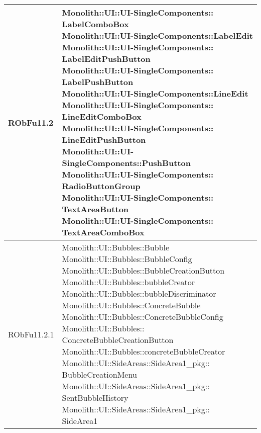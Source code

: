 \begin{center}
\begin{longtable}{|
*{1}{>{\centering\arraybackslash}m{2.5cm}|}
*{1}{>{\centering\arraybackslash}m{7.5cm}|}}
RObFu11.2 & \makecell[l]{Monolith::UI::UI-SingleComponents:: \\ \hfill LabelComboBox
\\Monolith::UI::UI-SingleComponents::LabelEdit
\\Monolith::UI::UI-SingleComponents:: \\ \hfill LabelEditPushButton
\\Monolith::UI::UI-SingleComponents:: \\ \hfill LabelPushButton
\\Monolith::UI::UI-SingleComponents::LineEdit
\\Monolith::UI::UI-SingleComponents:: \\ \hfill LineEditComboBox
\\Monolith::UI::UI-SingleComponents:: \\ \hfill LineEditPushButton
\\Monolith::UI::UI-SingleComponents::PushButton
\\Monolith::UI::UI-SingleComponents:: \\ \hfill RadioButtonGroup
\\Monolith::UI::UI-SingleComponents:: \\ \hfill TextAreaButton
\\Monolith::UI::UI-SingleComponents:: \\ \hfill TextAreaComboBox
\\}\\\hline
RObFu11.2.1 & \makecell[l]{Monolith::UI::Bubbles::Bubble
\\Monolith::UI::Bubbles::BubbleConfig
\\Monolith::UI::Bubbles::BubbleCreationButton
\\Monolith::UI::Bubbles::bubbleCreator
\\Monolith::UI::Bubbles::bubbleDiscriminator
\\Monolith::UI::Bubbles::ConcreteBubble
\\Monolith::UI::Bubbles::ConcreteBubbleConfig
\\Monolith::UI::Bubbles:: \\ \hfill ConcreteBubbleCreationButton
\\Monolith::UI::Bubbles::concreteBubbleCreator
\\Monolith::UI::SideAreas::SideArea1\_pkg:: \\ \hfill BubbleCreationMenu
\\Monolith::UI::SideAreas::SideArea1\_pkg:: \\ \hfill SentBubbleHistory
\\Monolith::UI::SideAreas::SideArea1\_pkg:: \\ \hfill SideArea1
}
\end{longtable}
\end{center}
